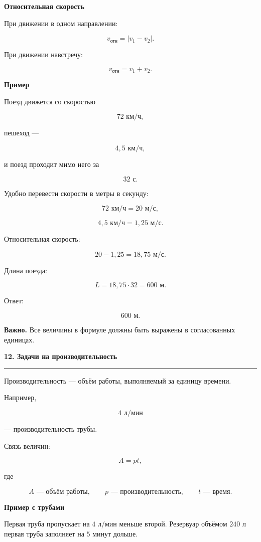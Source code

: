 \documentclass[a4paper,12pt]{article}
\newcommand{\topic}[1]{%
    \vspace{0.5em}
    {\Large\bfseries\textcolor{darkaccent}{#1}}\par
    \vspace{0.2em}
    {\color{accent}\rule{\linewidth}{0.7pt}}
    \vspace{0.5em}
}
\newcommand{\subtopic}[1]{%
    \vspace{0.5em}
    {\large\bfseries\textcolor{darkaccent}{#1}}\par
}
\newcommand{\warning}[1]{%
    \par\smallskip
    \textbf{\textcolor{accent}{Важно.}} #1
    \par\smallskip
}
\begin{document}
\subtopic{Относительная скорость}

При движении в одном направлении:

\[
v_{\text{отн}}=|v_1-v_2|.
\]

При движении навстречу:

\[
v_{\text{отн}}=v_1+v_2.
\]

\subtopic{Пример}

Поезд движется со скоростью

\[
72\text{ км/ч},
\]

пешеход ---

\[
4{,}5\text{ км/ч},
\]

и поезд проходит мимо него за

\[
32\text{ с}.
\]

Удобно перевести скорости в метры в секунду:

\[
72\text{ км/ч}=20\text{ м/с},
\]

\[
4{,}5\text{ км/ч}=1{,}25\text{ м/с}.
\]

Относительная скорость:

\[
20-1{,}25=18{,}75\text{ м/с}.
\]

Длина поезда:

\[
L=18{,}75\cdot32=600\text{ м}.
\]

Ответ:

\[
\boxed{600\text{ м}}.
\]

\warning{
Все величины в формуле должны быть выражены в согласованных единицах.
}


\topic{12. Задачи на производительность}

Производительность --- объём работы, выполняемый за единицу времени.

Например,

\[
4\text{ л/мин}
\]

--- производительность трубы.

Связь величин:

\[
A=pt,
\]

где

\[
A\text{ --- объём работы},\qquad
p\text{ --- производительность},\qquad
t\text{ --- время}.
\]

\subtopic{Пример с трубами}

Первая труба пропускает на \(4\) л/мин меньше второй. Резервуар объёмом \(240\) л первая труба заполняет на \(5\) минут дольше.
\end{document}
